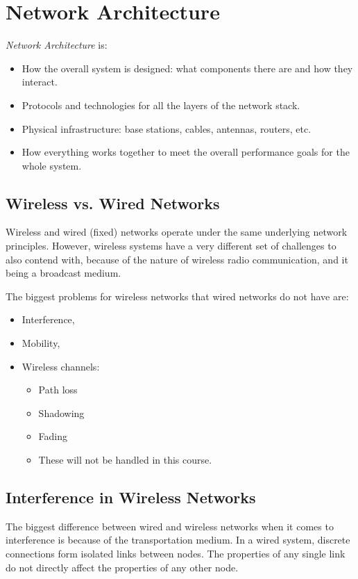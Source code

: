 \section{Network Architecture}\label{sec:Network_Architecture}
\begin{definition}\label{def:Network_Architecture}
  \emph{Network Architecture} is:
  \begin{itemize}[noitemsep]
  \item How the overall system is designed: what components there are and how they interact.
  \item Protocols and technologies for all the layers of the network stack.
  \item Physical infrastructure: base stations, cables, antennas, routers, etc.
  \item How everything works together to meet the overall performance goals for the whole system.
  \end{itemize}
\end{definition}

\subsection{Wireless vs. Wired Networks}\label{subsec:Wireless_vs_Wired}
Wireless and wired (fixed) networks operate under the same underlying network principles.
However, wireless systems have a very different set of challenges to also contend with, because of the nature of wireless radio communication, and it being a broadcast medium.

The biggest problems for wireless networks that wired networks do not have are:
\begin{itemize}[noitemsep]
\item Interference, 
\item Mobility, 
\item Wireless channels:
  \begin{itemize}[noitemsep]
  \item Path loss
  \item Shadowing
  \item Fading
  \item These will not be handled in this course.
  \end{itemize}
\end{itemize}

\subsection{Interference in Wireless Networks}\label{subsec:Wireless_Interference}
The biggest difference between wired and wireless networks when it comes to interference is because of the transportation medium.
In a wired system, discrete connections form isolated links between nodes.
The properties of any single link do not directly affect the properties of any other node.

